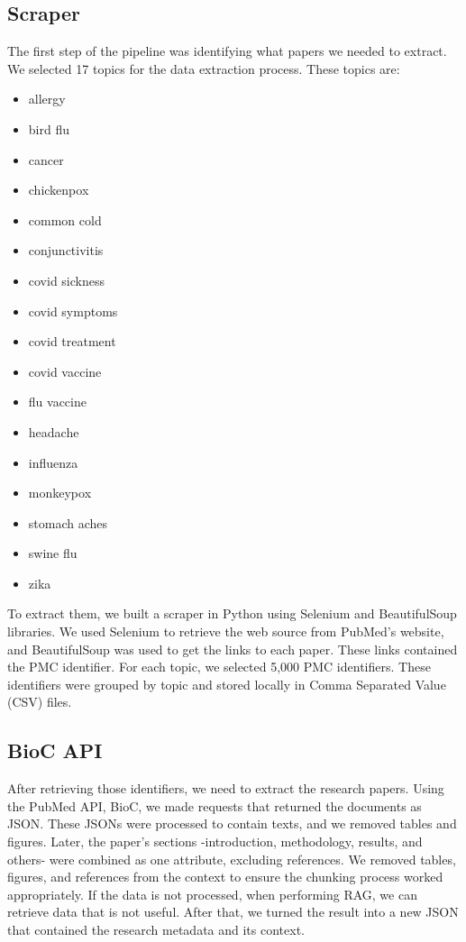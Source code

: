\subsection{Scraper}
The first step of the pipeline was identifying what papers we needed to extract. We selected 17 topics for the data extraction process. These topics are:
\begin{multicols}{2}
\begin{itemize}
	\item{allergy}
	\item{bird flu}
	\item{cancer}
	\item{chickenpox}
	\item{common cold}
	\item{conjunctivitis}
	\item{covid sickness}
	\item{covid symptoms}
	\item{covid treatment}
	\item{covid vaccine}
	\item{flu vaccine}
	\item{headache}
	\item{influenza}
	\item{monkeypox}
	\item{stomach aches}
	\item{swine flu}
	\item{zika}

\end{itemize}

\end{multicols}

To extract them, we built a scraper in Python using Selenium and BeautifulSoup libraries. We used Selenium to retrieve the web source from PubMed's website, and BeautifulSoup was used to get the links to each paper. These links contained the PMC identifier. For each topic, we selected 5,000 PMC identifiers. These identifiers were grouped by topic and stored locally in Comma Separated Value (CSV) files.

\subsection{BioC API}
After retrieving those identifiers, we need to extract the research papers. Using the PubMed API, BioC, we made requests that returned the documents as JSON. These JSONs were processed to contain texts, and we removed tables and figures. Later, the paper's sections -introduction, methodology, results, and others- were combined as one attribute, excluding references. We removed tables, figures, and references from the context to ensure the chunking process worked appropriately. If the data is not processed, when performing RAG, we can retrieve data that is not useful. After that, we turned the result into a new JSON that contained the research metadata and its context. 

